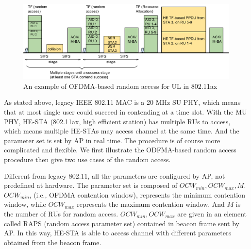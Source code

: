 

\begin{figure}[!t]
\centering
\includegraphics[scale=0.35]{./figure/chp2/RA_illu_2.png}
\caption{An example of OFDMA-based random access for UL in 802.11ax}
\label{fig_ra_ul}
\end{figure}

As stated above, legacy IEEE 802.11 MAC is a 20 MHz SU PHY, which means that at most single user could succeed in contending at a time slot.
With the MU PHY, HE-STA (802.11ax, high efficient station) has multiple RUs to access, which means multiple HE-STAs may access channel at the same time.
And the parameter set is set by AP in real time.
The procedure is of course more complicated and flexible.
We first illustrate the ODFMA-based random access procedure then give two use cases of the random access.

Different from legacy 802.11, all the parameters are configured by AP, not predefined at hardware. 
The parameter set is composed of $OCW_{min}, OCW_{max}, M$. $OCW_{min}$, (i.e., OFDMA contention window), represents the minimum contention window, while $OCW_{max}$ represents the maximum contention window. 
And $M$ is the number of RUs for random access. $OCW_{min}, OCW_{max}$ are given in an element called RAPS (random access parameter set) contained in beacon frame sent by AP.
In this way, HE-STA is able to access channel with different parameters obtained from the beacon frame. 


